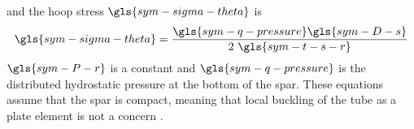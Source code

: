 and the hoop stress $\gls{sym-sigma-theta}$ is
\begin{equation}
     \gls{sym-sigma-theta} = \frac{
                                    \gls{sym-q-pressure}\gls{sym-D-s}
                                  }
                                  {
                                    2~\gls{sym-t-s-r}
                                  }
\end{equation}
$\gls{sym-P-r}$ is a constant and $\gls{sym-q-pressure}$ is the distributed hydrostatic pressure at the bottom of the spar.
These equations assume that the spar is compact,
meaning that local buckling of the tube as a plate element is not a concern \citep{american_bureau_of_shipping_requirements_2022}.

